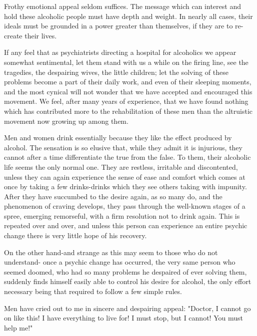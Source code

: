 {\begin{biblechapter}
\verse Frothy emotional appeal seldom suffices. 
\verse The message which can interest and hold these alcoholic people must have depth and weight. 
\verse In nearly all cases, their ideals must be grounded in a power greater than themselves, 
    if they are to re-create their lives.

\verse If any feel that as psychiatrists directing a hospital for alcoholics we appear somewhat sentimental, 
    let them stand with us a while on the firing line, 
    see the tragedies, the despairing wives, the little children; 
    let the solving of these problems become a part of their daily work, 
    and even of their sleeping moments, 
    and the most cynical will not wonder that we have accepted and encouraged this movement. 
\verse We feel, after many years of experience, 
    that we have found nothing which has contributed more to the rehabilitation of these men 
    than the altruistic movement now growing up among them.

\verse Men and women drink essentially because they like the effect produced by alcohol. 
\verse The sensation is so elusive that, while they admit it is injurious, 
    they cannot after a time differentiate the true from the false. 
\verse To them, their alcoholic life seems the only normal one. 
\verse They are restless, irritable and discontented, 
    unless they can again experience the sense of ease and comfort 
    which comes at once by taking a few drinks-drinks which they see others taking with impunity. 
\verse After they have succumbed to the desire again, as so many do, 
    and the phenomenon of craving develops, 
    they pass through the well-known stages of a spree, emerging remorseful, 
    with a firm resolution not to drink again. 
\verse This is repeated over and over, 
    and unless this person can experience an entire psychic change there is very little hope of his recovery.

\verse On the other hand-and strange as this may seem to those who do not understand-
    once a psychic change has occurred, 
    the very same person who seemed doomed, 
    who had so many problems he despaired of ever solving them, 
    suddenly finds himself easily able to control his desire for alcohol, 
    the only effort necessary being that required to follow a few simple rules.

\verse Men have cried out to me in sincere and despairing appeal: 
\verse "Doctor, I cannot go on like this! 
    I have everything to live for! 
    I must stop, but I cannot! 
    You must help me!"


\end{biblechapter}}
